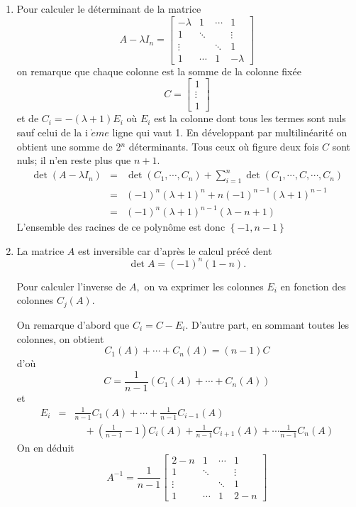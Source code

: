 
\begin{enumerate}
\item  Pour calculer le d{\'e}terminant de la matrice
\[
A-\lambda I_{n}=\left[
\begin{array}{cccc}
-\lambda  & 1 & \cdots  & 1 \\
1 & \ddots  &  & \vdots  \\
\vdots  &  & \ddots  & 1 \\
1 & \cdots  & 1 & -\lambda
\end{array}
\right]
\]
on remarque que chaque colonne est la somme de la colonne fix{\'e}e
\[
C=\left[
\begin{array}{c}
1 \\
\vdots  \\
1
\end{array}
\right] \] et de  $C_{i}=-(\lambda +1)E_{i}$ o{\`u} $E_{i}$ est la
colonne dont tous les termes sont nuls sauf celui de la i
$\grave{e}me$ ligne qui vaut 1. En d{\'e}veloppant par
multilin{\'e}arit{\'e} on obtient une somme de 2$^{n}$
d{\'e}terminants. Tous ceux o{\`u} figure deux fois $C$ sont nuls;
il n'en reste plus que $n+1$.
\begin{eqnarray*}
\det (A-\lambda I_{n}) &=&\det (C_{1},\cdots ,C_{n}) +
\sum_{i=1}^{n}\det (C_{1},\cdots ,C,\cdots
,C_{n})\\
&=&(-1)^{n}(\lambda +1)^{n}+n(-1)^{n-1}(\lambda
+1)^{n-1} \\
&=&(-1)^{n}(\lambda +1)^{n-1}(\lambda -n+1)
\end{eqnarray*}
L'ensemble des racines de ce polyn{\^o}me est donc $\left\{
-1,n-1\right\} $

\item  La matrice $A$ est inversible car d'apr{\`e}s le calcul pr{\'e}c{\'e}%
dent
\[\det A=(-1)^{n}(1-n).\]

Pour calculer l'inverse de $A,$ on va exprimer les colonnes
$E_{i}$ en fonction des colonnes $C_{j}(A)$.

On remarque d'abord que $C_{i}=C-E_{i}$. D'autre part, en sommant
toutes les
colonnes, on obtient
\[C_{1}(A)+\cdots +C_{n}(A)=(n-1)C\]
d'o{\`u}
\[C=\frac{1}{n-1}(C_{1}(A)+\cdots +C_{n}(A))\]
 et
\begin{eqnarray*}
E_{i}&=&\frac{1}{n-1}C_{1}(A)+\cdots + \frac{1}{n-1}C_{i-1}(A)\\
&\phantom{f}& \quad +(\frac{1}{n-1}%
-1)C_{i}(A)+\frac{1}{n-1}C_{i+1}(A)+\cdots \frac{1}{n-1}C_{n}(A)
\end{eqnarray*}
On en d{\'e}duit
\[
A^{-1}=\frac{1}{n-1}\left[
\begin{array}{cccc}
2-n & 1 & \cdots  & 1 \\
1 & \ddots  &  & \vdots  \\
\vdots  &  & \ddots  & 1 \\
1 & \cdots  & 1 & 2-n
\end{array}
\right]
\]


\end{enumerate}

